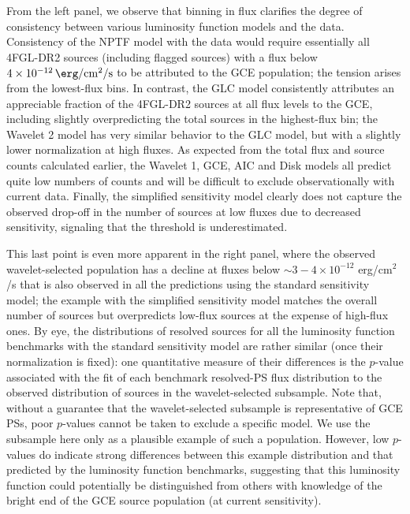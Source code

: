 \documentclass[letter,11pt]{article}
\begin{document}
From the left panel, we observe that binning in flux clarifies the degree of consistency between various luminosity function models and the data. Consistency of the NPTF model with the data would require essentially all 4FGL-DR2 sources (including flagged sources) with a flux below $\SI{4e-12}{\erg\per\centi\meter\squared\per\second}$ to be attributed to the GCE population; the tension arises from the lowest-flux bins. In contrast, the GLC model consistently attributes an appreciable fraction of the 4FGL-DR2 sources at all flux levels to the GCE, including slightly overpredicting the total sources in the highest-flux bin; the Wavelet 2 model has very similar behavior to the GLC model, but with a slightly lower normalization at high fluxes.  As expected from the total flux and source counts calculated earlier, the Wavelet 1, GCE, AIC and Disk models all predict quite low numbers of counts and will be difficult to exclude observationally with current data. Finally, the simplified sensitivity model clearly does not capture the observed drop-off in the number of sources at low fluxes due to decreased sensitivity, signaling that the threshold is underestimated.

This last point is even more apparent in the right panel, where the observed wavelet-selected population has a decline at fluxes below $\sim 3-4\times 10^{-12}$ erg/cm$^2$/s that is also observed in all the predictions using the standard sensitivity model; the example with the simplified sensitivity model matches the overall number of sources but overpredicts low-flux sources at the expense of high-flux ones. By eye, the distributions of resolved sources for all the luminosity function benchmarks with the standard sensitivity model are rather similar (once their normalization is fixed): one quantitative measure of their differences is the $p$-value associated with the fit of each benchmark resolved-PS flux distribution to the observed distribution of sources in the wavelet-selected subsample. Note that, without a guarantee that the wavelet-selected subsample is representative of GCE PSs, poor $p$-values cannot be taken to exclude a specific model. We use the subsample here only as a plausible example of such a population. However, low $p$-values do indicate strong differences between this example distribution and that predicted by the luminosity function benchmarks, suggesting that this luminosity function could potentially be distinguished from others with knowledge of the bright end of the GCE source population (at current sensitivity).
\end{document}
